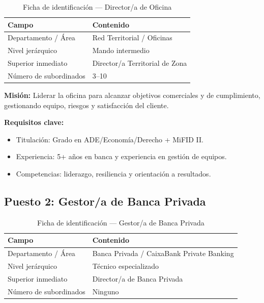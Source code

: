 \begin{table}[H]
  \centering
  \small
  \caption{Ficha de identificación — Director/a de Oficina}
  \begin{tabularx}{\textwidth}{lX}
    \toprule
    \textbf{Campo}                & \textbf{Contenido} \\
    \midrule
    Departamento / Área           & Red Territorial / Oficinas \\
    Nivel jerárquico              & Mando intermedio \\
    Superior inmediato            & Director/a Territorial de Zona \\
    Número de subordinados        & 3–10 \\
    \bottomrule
  \end{tabularx}
\end{table}

\textbf{Misión:} Liderar la oficina para alcanzar objetivos comerciales y de cumplimiento, gestionando equipo, riesgos y satisfacción del cliente.

\textbf{Requisitos clave:}
\begin{itemize}
  \item Titulación: Grado en ADE/Economía/Derecho + MiFID II.
  \item Experiencia: 5+ años en banca y experiencia en gestión de equipos.
  \item Competencias: liderazgo, resiliencia y orientación a resultados.
\end{itemize}

\subsection{Puesto 2: Gestor/a de Banca Privada}

\begin{table}[H]
  \centering
  \small
  \caption{Ficha de identificación — Gestor/a de Banca Privada}
  \begin{tabularx}{\textwidth}{lX}
    \toprule
    \textbf{Campo}                & \textbf{Contenido} \\
    \midrule
    Departamento / Área           & Banca Privada / CaixaBank Private Banking \\
    Nivel jerárquico              & Técnico especializado \\
    Superior inmediato            & Director/a de Banca Privada \\
    Número de subordinados        & Ninguno \\
    \bottomrule
  \end{tabularx}
\end{table}

